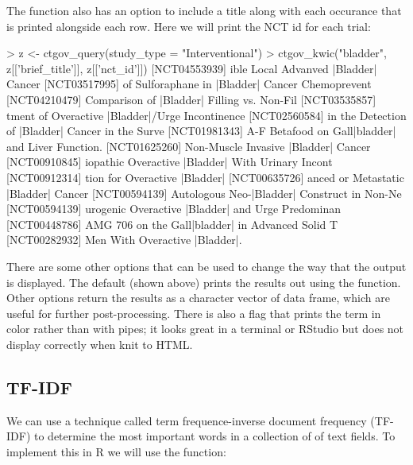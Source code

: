 The function also has an option to include a title along with each occurance
that is printed alongside each row. Here we will print the NCT id for each
trial:

\begin{example}
> z <- ctgov_query(study_type = "Interventional")
> ctgov_kwic("bladder", z[['brief_title']], z[['nct_id']])
[NCT04553939] ible Local Advanved |Bladder| Cancer
[NCT03517995]  of Sulforaphane in |Bladder| Cancer Chemoprevent
[NCT04210479]       Comparison of |Bladder| Filling vs. Non-Fil
[NCT03535857] tment of Overactive |Bladder|/Urge Incontinence
[NCT02560584] in the Detection of |Bladder| Cancer in the Surve
[NCT01981343] A-F Betafood on Gall|bladder| and Liver Function.
[NCT01625260] Non-Muscle Invasive |Bladder| Cancer
[NCT00910845] iopathic Overactive |Bladder| With Urinary Incont
[NCT00912314] tion for Overactive |Bladder|
[NCT00635726] anced or Metastatic |Bladder| Cancer
[NCT00594139]      Autologous Neo-|Bladder| Construct in Non-Ne
[NCT00594139] urogenic Overactive |Bladder| and Urge Predominan
[NCT00448786]  AMG 706 on the Gall|bladder| in Advanced Solid T
[NCT00282932] Men With Overactive |Bladder|.
\end{example}

There are some other options that can be used to change the way that the
output is displayed. The default (shown above) prints the results out using
the  function. Other options return the results as a character vector of
data frame, which are useful for further post-processing. There is also a
flag  that prints the term in color rather than with pipes; it looks
great in a terminal or RStudio but does not display correctly when knit to
HTML.

\subsection{TF-IDF}

We can use a technique called term frequence-inverse document frequency (TF-IDF)
to determine the most important words in a collection of of text fields. To
implement this in R we will use the  function:

